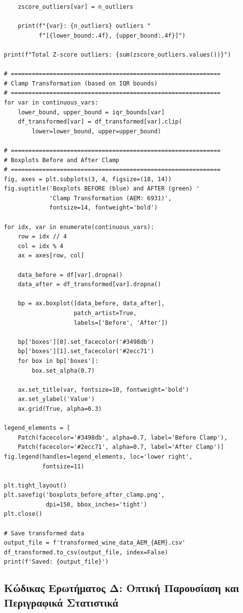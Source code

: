 \documentclass[12pt,a4paper]{article}
\begin{document}
\begin{lstlisting}
    zscore_outliers[var] = n_outliers

    print(f"{var}: {n_outliers} outliers "
          f"[{lower_bound:.4f}, {upper_bound:.4f}]")

print(f"Total Z-score outliers: {sum(zscore_outliers.values())}")

# ============================================================
# Clamp Transformation (based on IQR bounds)
# ============================================================
for var in continuous_vars:
    lower_bound, upper_bound = iqr_bounds[var]
    df_transformed[var] = df_transformed[var].clip(
        lower=lower_bound, upper=upper_bound)

# ============================================================
# Boxplots Before and After Clamp
# ============================================================
fig, axes = plt.subplots(3, 4, figsize=(18, 14))
fig.suptitle('Boxplots BEFORE (blue) and AFTER (green) '
             'Clamp Transformation (AEM: 6931)',
             fontsize=14, fontweight='bold')

for idx, var in enumerate(continuous_vars):
    row = idx // 4
    col = idx % 4
    ax = axes[row, col]

    data_before = df[var].dropna()
    data_after = df_transformed[var].dropna()

    bp = ax.boxplot([data_before, data_after],
                    patch_artist=True,
                    labels=['Before', 'After'])

    bp['boxes'][0].set_facecolor('#3498db')
    bp['boxes'][1].set_facecolor('#2ecc71')
    for box in bp['boxes']:
        box.set_alpha(0.7)

    ax.set_title(var, fontsize=10, fontweight='bold')
    ax.set_ylabel('Value')
    ax.grid(True, alpha=0.3)

legend_elements = [
    Patch(facecolor='#3498db', alpha=0.7, label='Before Clamp'),
    Patch(facecolor='#2ecc71', alpha=0.7, label='After Clamp')]
fig.legend(handles=legend_elements, loc='lower right',
           fontsize=11)

plt.tight_layout()
plt.savefig('boxplots_before_after_clamp.png',
            dpi=150, bbox_inches='tight')
plt.close()

# Save transformed data
output_file = f'transformed_wine_data_AEM_{AEM}.csv'
df_transformed.to_csv(output_file, index=False)
print(f'Saved: {output_file}')
\end{lstlisting}

\subsection{Κώδικας Ερωτήματος Δ: Οπτική Παρουσίαση και Περιγραφικά Στατιστικά}
\end{document}
